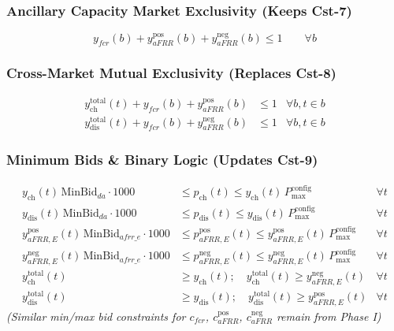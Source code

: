 \documentclass[11pt, a4paper]{article}
\begin{document}
\subsubsection{Ancillary Capacity Market Exclusivity (Keeps Cst-7)}
\begin{equation}
    y_{fcr}(b) + y^{\mathrm{pos}}_{aFRR}(b) + y^{\mathrm{neg}}_{aFRR}(b) \le 1 \qquad \forall b
\end{equation}

\subsubsection{Cross-Market Mutual Exclusivity (Replaces Cst-8)}
\begin{align}
    y^{\mathrm{total}}_{\mathrm{ch}}(t) + y_{fcr}(b) + y^{\mathrm{pos}}_{aFRR}(b) &\le 1 & \forall b, t \in b \\
    y^{\mathrm{total}}_{\mathrm{dis}}(t) + y_{fcr}(b) + y^{\mathrm{neg}}_{aFRR}(b) &\le 1 & \forall b, t \in b
\end{align}

\subsubsection{Minimum Bids \& Binary Logic (Updates Cst-9)}
\begin{align}
    y_{\mathrm{ch}}(t)\,\text{MinBid}_{da} \cdot 1000 &\le p_{\mathrm{ch}}(t) \le y_{\mathrm{ch}}(t)\,P^{\mathrm{config}}_{\max} & \forall t \\
    y_{\mathrm{dis}}(t)\,\text{MinBid}_{da} \cdot 1000 &\le p_{\mathrm{dis}}(t) \le y_{\mathrm{dis}}(t)\,P^{\mathrm{config}}_{\max} & \forall t \\
    y^{\mathrm{pos}}_{aFRR,E}(t)\,\text{MinBid}_{afrr\_e} \cdot 1000 &\le p^{\mathrm{pos}}_{aFRR,E}(t) \le y^{\mathrm{pos}}_{aFRR,E}(t)\,P^{\mathrm{config}}_{\max} & \forall t \\
    y^{\mathrm{neg}}_{aFRR,E}(t)\,\text{MinBid}_{afrr\_e} \cdot 1000 &\le p^{\mathrm{neg}}_{aFRR,E}(t) \le y^{\mathrm{neg}}_{aFRR,E}(t)\,P^{\mathrm{config}}_{\max} & \forall t \\
    y^{\mathrm{total}}_{\mathrm{ch}}(t) &\ge y_{\mathrm{ch}}(t); \quad y^{\mathrm{total}}_{\mathrm{ch}}(t) \ge y^{\mathrm{neg}}_{aFRR,E}(t) & \forall t \\
    y^{\mathrm{total}}_{\mathrm{dis}}(t) &\ge y_{\mathrm{dis}}(t); \quad y^{\mathrm{total}}_{\mathrm{dis}}(t) \ge y^{\mathrm{pos}}_{aFRR,E}(t) & \forall t
\end{align}
\textit{(Similar min/max bid constraints for $c_{fcr}$, $c^{\mathrm{pos}}_{aFRR}$, $c^{\mathrm{neg}}_{aFRR}$ remain from Phase I)}
\end{document}
